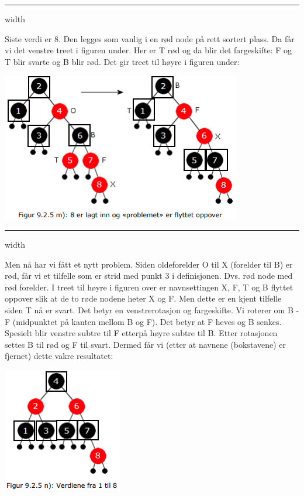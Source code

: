 \documentclass[11pt]{article}
\begin{document}
        \hrule width \textwidth

        Siste verdi er 8. Den legges som vanlig i en rød node på rett sortert plass. Da får vi det
        venstre treet i figuren under. Her er T rød og da blir det fargeskifte: F og T blir svarte og B
        blir rød. Det gir treet til høyre i figuren under:

        \includegraphics[center]{f-9.2.5m.png}

        \hrule width \textwidth

        \begin{multicols}{2}
            Men nå har vi fått et nytt problem. Siden oldeforelder O til X (forelder til B) er rød, får vi et
            tilfelle som er strid med punkt 3 i definisjonen. Dvs. rød node med rød forelder. I treet til
            høyre i figuren over er navnsettingen X, F, T og B flyttet oppover slik at de to røde nodene
            heter X og F. Men dette er en kjent tilfelle siden T nå er svart. Det betyr en venstrerotasjon
            og fargeskifte. Vi roterer om B - F (midpunktet på kanten mellom B og F). Det betyr at F
            heves og B senkes. Spesielt blir venstre subtre til F etterpå høyre subtre til B. Etter
            rotasjonen settes B til rød og F til svart. Dermed får vi (etter at navnene (bokstavene) er
            fjernet) dette vakre resultatet:


            \columnbreak
            \includegraphics[center]{f-9.2.5n.png}

        \end{multicols}
\end{document}
